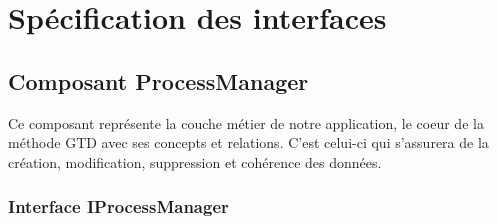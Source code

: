\chapter{Spécification des interfaces}



\section{Composant ProcessManager}

	Ce composant représente la couche métier de notre application, le coeur de la méthode GTD avec ses concepts et relations. C'est celui-ci qui s'assurera de la création, modification, suppression et cohérence des données.

	\subsection{Interface IProcessManager}
	
